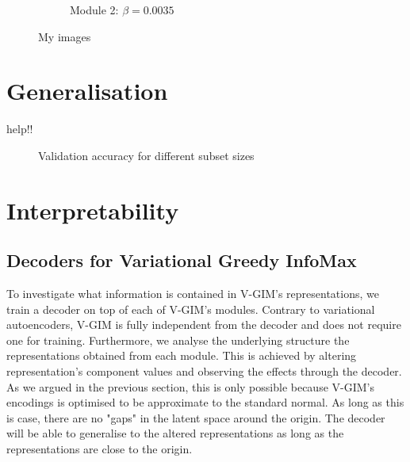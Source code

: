 \begin{figure}[ht]
\begin{subfigure}{0.45\linewidth}
			\caption{Module 2: $\beta=0.0035$}
			\label{fig:t-sne-kld0-module-2}
		\end{subfigure}
		\caption{My images}
		\label{fig:myimages}
	\end{figure}

		
		
	
		
		
	



\section{Generalisation}
	help!!
	
	\begin{figure}[h] %
		\centering
		\begin{subfigure}[b]{0.4\textwidth}
			\centering
			
		\end{subfigure}
		\hfill
		\begin{subfigure}[b]{0.4\textwidth}
			\centering
			
		\end{subfigure}
		\caption{Validation accuracy for different subset sizes}
	\end{figure}






	


\section{Interpretability}

	\subsection{Decoders for Variational Greedy InfoMax}
		To investigate what information is contained in V-GIM's representations, we train a decoder on top of each of V-GIM's modules. Contrary to variational autoencoders, V-GIM is fully independent from the decoder and does not require one for training. Furthermore, we analyse the underlying structure the representations obtained from each module. This is achieved by altering representation's component values and observing the effects through the decoder. As we argued in the previous section, this is only possible because V-GIM's encodings is optimised to be approximate to the standard normal. As long as this is case, there are no "gaps" in the latent space around the origin. The decoder will be able to generalise to the altered representations as long as the representations are close to the origin.
		
